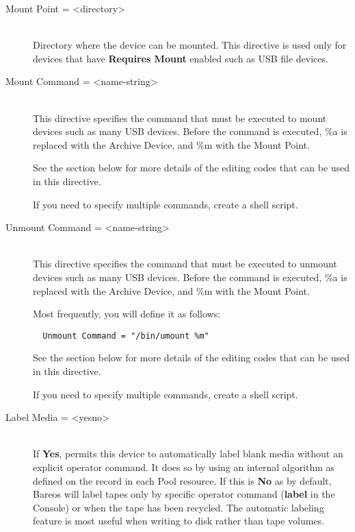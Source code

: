 \begin{description}
\item [Mount Point = {\textless}directory{\textgreater}] \hfill \\
Directory where the device can be mounted.
This directive is used only
for devices that have {\bf Requires Mount} enabled such as
USB file devices.

\item [Mount Command = {\textless}name-string{\textgreater}] \hfill \\
This directive specifies the command that must be executed to mount
devices such as many USB devices. Before the command is
executed, \%a is replaced with the Archive Device, and \%m with the Mount
Point.

See the  section below for more details of
the editing codes that can be used in this directive.

If you need to specify multiple commands, create a shell script.

\item [Unmount Command = {\textless}name-string{\textgreater}] \hfill \\
This directive specifies the command that must be executed to unmount
devices such as many USB devices. Before the command  is
executed, \%a is replaced with the Archive Device, and \%m with the  Mount
Point.

Most frequently, you will define it as follows:

\footnotesize
\begin{verbatim}
  Unmount Command = "/bin/umount %m"
\end{verbatim}
\normalsize

See the  section below for more details of
the editing codes that can be used in this directive.

If you need to specify multiple commands, create a shell script.

\item [Label Media = {\textless}yes{\textbar}no{\textgreater}] \hfill \\
If {\bf Yes}, permits this device to automatically label blank media
without an explicit operator command.  It does so by using an internal
algorithm as defined on the  record in each
Pool resource.  If this is {\bf No} as by default, Bareos will label
tapes only by specific operator command ({\bf label} in the Console) or
when the tape has been recycled.  The automatic labeling feature is most
useful when writing to disk rather than tape volumes.


\end{description}
